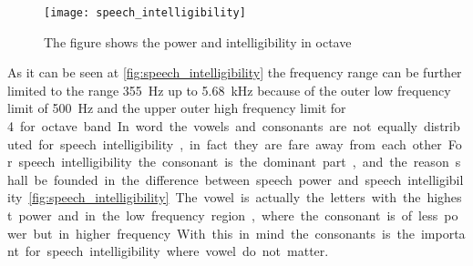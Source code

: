  \begin{figure}[H]
	\centering
		\texttt{[image: speech\_intelligibility]}
		\caption{The figure shows the power and intelligibility in octave  \citep{arl_us_army}}
		\label{fig:speech_intelligibility}
\end{figure}

As it can be seen at \autoref{fig:speech_intelligibility} the frequency range can be further limited to the range \SI{355}{\hertz} up to \SI{5.68}{\kilo\hertz} because of the outer low frequency limit of \SI{500}{\hertz} and the upper outer high frequency limit for \SI{4} for octave band. 

In word the vowels and consonants are not equally distributed for speech intelligibility, in fact they are fare away from each other. For speech intelligibility the consonant is the dominant part, and the reason shall be founded in the difference between speech power and speech intelligibility \autoref{fig:speech_intelligibility}. The vowel is actually the letters with the highest power and in the low frequency region, where the consonant is of less power but in higher frequency. With this in mind the consonants is the important for speech intelligibility where vowel do not matter.




